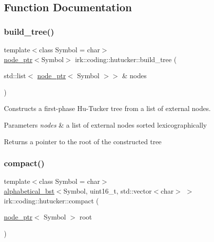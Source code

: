 \subsection{Function Documentation}
\mbox{\label{namespaceirk_1_1coding_1_1hutucker_ae962db3e3b0d823d81dd74c57e129887}} 
\subsubsection{\texorpdfstring{build\+\_\+tree()}{build\_tree()}}
{\footnotesize\ttfamily template$<$class Symbol  = char$>$ \\
\mbox{\hyperlink{namespaceirk_1_1coding_1_1hutucker_aa5d22cfdf05ffec38f2531e0307248fe}{node\+\_\+ptr}}$<$Symbol$>$ irk\+::coding\+::hutucker\+::build\+\_\+tree (\begin{DoxyParamCaption}\item[{std\+::list$<$ \mbox{\hyperlink{namespaceirk_1_1coding_1_1hutucker_aa5d22cfdf05ffec38f2531e0307248fe}{node\+\_\+ptr}}$<$ Symbol $>$$>$ \&}]{nodes }\end{DoxyParamCaption})}



Constructs a first-\/phase Hu-\/\+Tucker tree from a list of external nodes. 


\begin{DoxyParams}{Parameters}
{\em nodes} & a list of external nodes sorted lexicographically \\
\hline
\end{DoxyParams}
\begin{DoxyReturn}{Returns}
a pointer to the root of the constructed tree 
\end{DoxyReturn}
\mbox{\label{namespaceirk_1_1coding_1_1hutucker_a8439e61ebf9f3af2e42bce48905832b5}} 
\subsubsection{\texorpdfstring{compact()}{compact()}}
{\footnotesize\ttfamily template$<$class Symbol  = char$>$ \\
\mbox{\hyperlink{classirk_1_1alphabetical__bst}{alphabetical\+\_\+bst}}$<$Symbol, uint16\+\_\+t, std\+::vector$<$char$>$ $>$ irk\+::coding\+::hutucker\+::compact (\begin{DoxyParamCaption}\item[{\mbox{\hyperlink{namespaceirk_1_1coding_1_1hutucker_aa5d22cfdf05ffec38f2531e0307248fe}{node\+\_\+ptr}}$<$ Symbol $>$}]{root }\end{DoxyParamCaption})}



